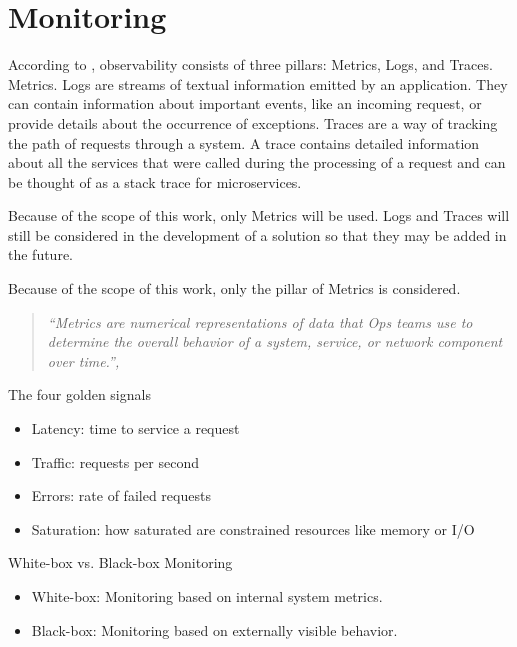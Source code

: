 
\section{Monitoring}


According to \cite{9837035}, observability consists of three pillars: Metrics, Logs, and Traces.
Metrics.
Logs are streams of textual information emitted by an application. They can contain information about important
events, like an incoming request, or provide details about the occurrence of exceptions.
Traces are a way of tracking the path of requests through a system. A trace contains detailed information
about all the services that were called during the processing of a request and can be thought of
as a stack trace for microservices.

Because of the scope of this work, only Metrics will be used. Logs and Traces will still be considered
in the development of a solution so that they may be added in the future.

Because of the scope of this work, only the pillar of Metrics is considered.

\begin{quote}
\textit{``Metrics are numerical representations of data that Ops teams use to determine the overall behavior of a system, service, or network component over time.'', \cite{9837035}}
\end{quote}

The four golden signals \cite{Beyer2016-xi}
\begin{itemize}
    \item Latency: time to service a request
    \item Traffic: requests per second
    \item Errors: rate of failed requests
    \item Saturation: how saturated are constrained resources like memory or I/O
\end{itemize}

White-box vs. Black-box Monitoring \cite{Beyer2016-xi}
\begin{itemize}
    \item White-box: Monitoring based on internal system metrics.
    \item Black-box: Monitoring based on externally visible behavior.
\end{itemize}


